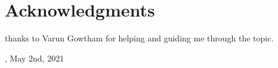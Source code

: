 \chapter*{Acknowledgments}

thanks to Varun Gowtham for helping and guiding me through the topic.

\vspace{0.5in}
\begin{flushright}
  \metaCity, May 2nd, 2021%
\end{flushright}